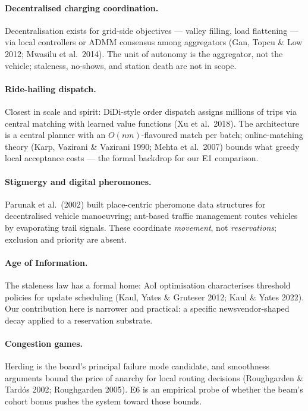 \documentclass[twoside,twocolumn,usenatbib]{mnras}
\begin{document}
\paragraph{Decentralised charging coordination.}  Decentralisation
exists for grid-side objectives --- valley filling, load flattening ---
via local controllers or ADMM consensus among aggregators
(Gan, Topcu \& Low 2012; Mwasilu et al.\ 2014).  The unit of
autonomy is the aggregator, not the vehicle; staleness, no-shows,
and station death are not in scope.

\paragraph{Ride-hailing dispatch.}  Closest in scale and spirit:
DiDi-style order dispatch assigns millions of trips via central
matching with learned value functions (Xu et al.\ 2018).  The
architecture is a central planner with an $O(nm)$-flavoured match
per batch; online-matching theory (Karp, Vazirani \& Vazirani 1990;
Mehta et al.\ 2007) bounds what greedy local acceptance costs ---
the formal backdrop for our E1 comparison.

\paragraph{Stigmergy and digital pheromones.}  Parunak et al.\
(2002) built place-centric pheromone data structures for
decentralised vehicle manoeuvring; ant-based traffic management
routes vehicles by evaporating trail signals.  These coordinate
\emph{movement}, not \emph{reservations}; exclusion and priority are
absent.

\paragraph{Age of Information.}  The staleness law has a formal
home: AoI optimisation characterises threshold policies for update
scheduling (Kaul, Yates \& Gruteser 2012; Kaul \& Yates 2022).
Our contribution here is narrower and practical: a specific
newsvendor-shaped decay applied to a reservation substrate.

\paragraph{Congestion games.}  Herding is the board's principal
failure mode candidate, and smoothness arguments bound the price of
anarchy for local routing decisions (Roughgarden \& Tard\'os 2002;
Roughgarden 2005).  E6 is an empirical probe of whether the beam's
cohort bonus pushes the system toward those bounds.
\end{document}
